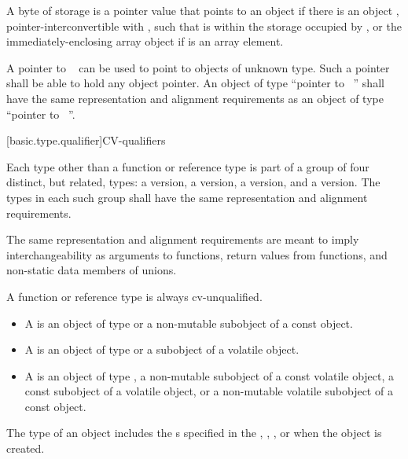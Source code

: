 \pnum
A byte of storage 
is 
a pointer value that points to an object 
if there is an object ,
pointer-interconvertible with ,
such that  is within the storage occupied by
, or the immediately-enclosing array object
if  is an array element.

\pnum
{}%
%
A pointer to \cv{}~
can be used to point to objects of
unknown type. Such a pointer shall be able to hold any object pointer.
An object of type ``pointer to \cv{}~''
shall have the same representation and alignment
requirements as an object of type ``pointer to \cv{}~''.

[basic.type.qualifier]{CV-qualifiers}

\pnum
{}%
%
%
Each type other than a function or reference type
is part of a group of four distinct, but related, types:
a  version,
a  version,
a  version, and
a  version.
The types in each such group shall have
the same representation and alignment requirements.
\begin{footnote}
The same representation and alignment requirements
are meant to imply interchangeability as
arguments to functions,
return values from functions, and
non-static data members of unions.
\end{footnote}
A function or reference type is always cv-unqualified.
\begin{itemize}
\item A  is an object of type  or a
  non-mutable subobject of a const object.

\item A  is an object of type
   or a subobject of a volatile object.

\item A  is an object of type
  , a non-mutable subobject of a const volatile object,
  a const subobject of a volatile object, or a non-mutable volatile
  subobject of a const object.
\end{itemize}
\begin{note}
The type of an object includes
the s specified in the
,
,
, or
when the object is created.
\end{note}

